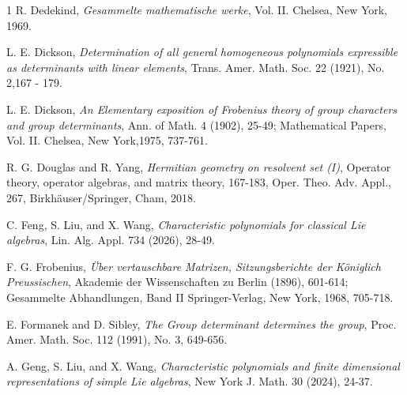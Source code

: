 \documentclass[draft, 12pt, reqno]{amsart}
\numberwithin{equation}{section}
\theoremstyle{plain}
\begin{document}
\begin{thebibliography}{1}
 R. Dedekind, {\em Gesammelte mathematische werke}, Vol. II. Chelsea, New York, 1969.


 L. E. Dickson, {\em Determination of all general homogeneous polynomials expressible as determinants with linear elements}, Trans. Amer. Math. Soc. 22 (1921), No. 2,167 - 179.

 L. E. Dickson, {\em An Elementary exposition of Frobenius theory of group characters and group determinants}, Ann. of Math. 4 (1902), 25-49; Mathematical Papers, Vol. II. Chelsea, New York,1975, 737-761.

 R. G. Douglas and R. Yang, {\em Hermitian geometry on resolvent set (I)}, Operator theory, operator algebras, and matrix theory, 167-183, Oper. Theo. Adv. Appl., 267, Birkh\"{a}user/Springer, Cham, 2018.


 C. Feng, S. Liu, and X. Wang, {\em Characteristic polynomials for classical Lie algebras}, Lin. Alg. Appl. 734 (2026), 28-49.

 F. G. Frobenius, {\em \"{U}ber vertauschbare Matrizen, Sitzungsberichte der K\"{o}niglich Preussischen}, Akademie der Wissenschaften zu Berlin (1896), 601-614; Gesammelte Abhandlungen, Band II Springer-Verlag, New York, 1968, 705-718.

 E. Formanek and D. Sibley, {\em The Group determinant determines the group}, Proc. Amer. Math. Soc. 112 (1991), No. 3, 649-656.




 A. Geng, S. Liu, and X. Wang, {\em Characteristic polynomials and finite dimensional representations of simple Lie algebras}, New York J. Math. 30 (2024), 24-37.


\end{thebibliography}
\end{document}
